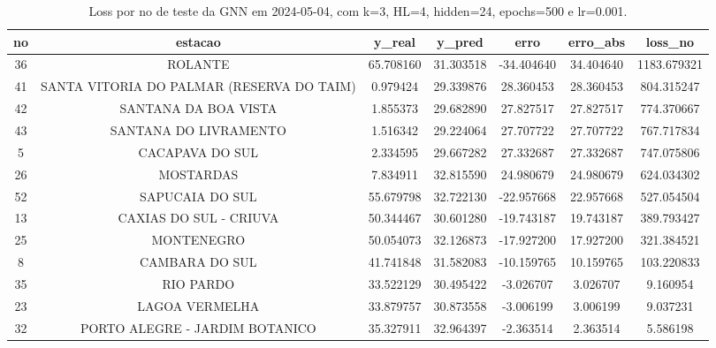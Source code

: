 \begin{table}[h]
\centering
\caption{Loss por no de teste da GNN em 2024-05-04, com k=3, HL=4, hidden=24, epochs=500 e lr=0.001.}
\label{tab:gnn_loss_k3_hl4_h24_e500_d20240504}
\begin{tabular}{ccccccc}
\toprule
no & estacao & y\_real & y\_pred & erro & erro\_abs & loss\_no \\
\midrule
36 & ROLANTE & 65.708160 & 31.303518 & -34.404640 & 34.404640 & 1183.679321 \\
41 & SANTA VITORIA DO PALMAR (RESERVA DO TAIM) & 0.979424 & 29.339876 & 28.360453 & 28.360453 & 804.315247 \\
42 & SANTANA DA BOA VISTA & 1.855373 & 29.682890 & 27.827517 & 27.827517 & 774.370667 \\
43 & SANTANA DO LIVRAMENTO & 1.516342 & 29.224064 & 27.707722 & 27.707722 & 767.717834 \\
5 & CACAPAVA DO SUL & 2.334595 & 29.667282 & 27.332687 & 27.332687 & 747.075806 \\
26 & MOSTARDAS & 7.834911 & 32.815590 & 24.980679 & 24.980679 & 624.034302 \\
52 & SAPUCAIA DO SUL & 55.679798 & 32.722130 & -22.957668 & 22.957668 & 527.054504 \\
13 & CAXIAS DO SUL - CRIUVA & 50.344467 & 30.601280 & -19.743187 & 19.743187 & 389.793427 \\
25 & MONTENEGRO & 50.054073 & 32.126873 & -17.927200 & 17.927200 & 321.384521 \\
8 & CAMBARA DO SUL & 41.741848 & 31.582083 & -10.159765 & 10.159765 & 103.220833 \\
35 & RIO PARDO & 33.522129 & 30.495422 & -3.026707 & 3.026707 & 9.160954 \\
23 & LAGOA VERMELHA & 33.879757 & 30.873558 & -3.006199 & 3.006199 & 9.037231 \\
32 & PORTO ALEGRE - JARDIM BOTANICO & 35.327911 & 32.964397 & -2.363514 & 2.363514 & 5.586198 \\
\bottomrule
\end{tabular}
\end{table}
